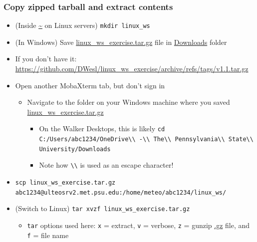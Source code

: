 \documentclass[hyperref,pdfa,unicode,utf8,usepdftitle]{beamer}
\begin{document}
\begin{frame}
  \frametitle{Copy zipped tarball and extract contents}
  \begin{itemize}
  \item (Inside \url{~} on Linux servers) \lstinline{mkdir linux_ws}
  \item (In Windows) Save \url{linux_ws_exercise.tar.gz} file
    in \url{Downloads} folder
  \item If you don’t have
    it:
    \url{https://github.com/DWesl/linux_ws_exercise/archive/refs/tags/v1.1.tar.gz}
  \item Open another MobaXterm tab, but don’t sign in
    \begin{itemize}
    \item Navigate to the folder on your Windows machine where you
      saved \url{linux_ws_exercise.tar.gz}
      \begin{itemize}
      \item On the Walker Desktops, this is
        likely
        \lstinline{cd C:/Users/abc1234/OneDrive\\ -\\ The\\ Pennsylvania\\ State\\ University/Downloads}
      \item Note how \lstinline{\\} is used as an escape character!
      \end{itemize}
    \end{itemize}
  \item
    \lstinline{scp linux_ws_exercise.tar.gz abc1234@ulteosrv2.met.psu.edu:/home/meteo/abc1234/linux_ws/}
  \item (Switch to
    Linux) \lstinline{tar xvzf linux_ws_exercise.tar.gz}
    \begin{itemize}
    \item \lstinline{tar} options used here: \lstinline{x} =
      extract, \lstinline{v} = verbose, \lstinline{z} =
      gunzip \url{.gz} file, and \lstinline{f} = file name
    \end{itemize}
  \end{itemize}
\end{frame}
\end{document}
